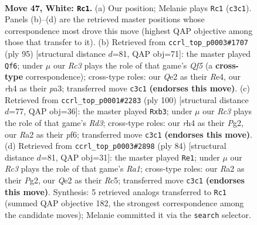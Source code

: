 \documentclass[11pt]{article}
\begin{document}
\clearpage

\begin{figure}[p]\centering
\begin{subfigure}{0.46\textwidth}\centering
\resizebox{\linewidth}{!}{%
\newchessgame
\chessboard[
  setfen={r5k1/3n4/1q6/1P1p3p/p6r/P1R1N3/R3Q3/6K1 w - - 0 47},
  showmover=false,
  pgfstyle=straightmove, color=movearrow, markmove={c3-c1}
]}
\caption{}
\end{subfigure}\hfill
\begin{subfigure}{0.46\textwidth}\centering
\resizebox{\linewidth}{!}{%
\newchessgame
\chessboard[
  setfen={4r3/Q4p2/p5k1/8/1P2rq2/P3p2P/4R1P1/3R2K1 b - - 22 48},
  showmover=false,
  pgfstyle=straightmove, color=movearrow, markmove={f4-f6}
]}
\caption{}
\end{subfigure}
\\[4pt]
\begin{subfigure}{0.46\textwidth}\centering
\resizebox{\linewidth}{!}{%
\newchessgame
\chessboard[
  setfen={3r1r1k/2RP3p/5ppP/q3p3/P1Q5/1p1R4/6P1/7K w - - 0 51},
  showmover=false,
  pgfstyle=straightmove, color=movearrow, markmove={d3-b3}
]}
\caption{}
\end{subfigure}\hfill
\begin{subfigure}{0.46\textwidth}\centering
\resizebox{\linewidth}{!}{%
\newchessgame
\chessboard[
  setfen={q2r2k1/5p2/3P1P1p/2R3p1/7r/8/P2Q2P1/R5K1 w - - 2 43},
  showmover=false,
  pgfstyle=straightmove, color=movearrow, markmove={a1-e1}
]}
\caption{}
\end{subfigure}
\caption{\textbf{Move 47, White: \texttt{Rc1}.} (a) Our position; Melanie plays \texttt{Rc1} (\texttt{c3c1}). Panels (b)--(d) are the retrieved master positions whose correspondence most drove this move (highest QAP objective among those that transfer to it). (b) Retrieved from \texttt{ccrl\_top\_p0003\#1707} (ply 95) [structural distance $d$=81, QAP obj=71]: the master played \texttt{Qf6}; under $\mu$ our \emph{Rc3} plays the role of that game's \emph{Qf5} (a \textbf{cross-type} correspondence); cross-type roles: our \emph{Q}e2 as their \emph{R}e4, our \emph{r}h4 as their \emph{p}a3; transferred move \texttt{c3c1} \textbf{(endorses this move)}. (c) Retrieved from \texttt{ccrl\_top\_p0001\#2283} (ply 100) [structural distance $d$=77, QAP obj=36]: the master played \texttt{Rxb3}; under $\mu$ our \emph{Rc3} plays the role of that game's \emph{Rd3}; cross-type roles: our \emph{r}h4 as their \emph{P}g2, our \emph{R}a2 as their \emph{p}f6; transferred move \texttt{c3c1} \textbf{(endorses this move)}. (d) Retrieved from \texttt{ccrl\_top\_p0003\#2898} (ply 84) [structural distance $d$=81, QAP obj=31]: the master played \texttt{Re1}; under $\mu$ our \emph{Rc3} plays the role of that game's \emph{Ra1}; cross-type roles: our \emph{R}a2 as their \emph{P}g2, our \emph{Q}e2 as their \emph{R}c5; transferred move \texttt{c3c1} \textbf{(endorses this move)}. Synthesis: 5 retrieved analogs transferred to \texttt{Rc1} (summed QAP objective 182, the strongest correspondence among the candidate moves); Melanie committed it via the \texttt{search} selector.}
\label{fig:thought-m92}
\end{figure}
\end{document}
